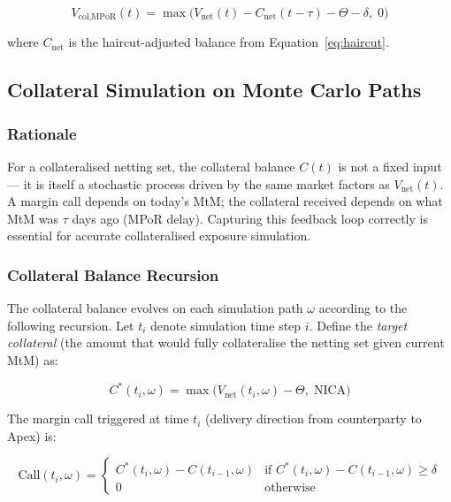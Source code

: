 \documentclass[11pt,a4paper]{article}
\begin{document}
\begin{equation}
  V_{\text{col,MPoR}}(t)
    = \max\!\bigl(V_{\text{net}}(t) - C_{\text{net}}(t-\tau) - \Theta - \delta,\; 0\bigr)
  \label{eq:mpor_exposure}
\end{equation}

where $C_{\text{net}}$ is the haircut-adjusted balance from
Equation~\eqref{eq:haircut}.

\subsection{Collateral Simulation on Monte Carlo Paths}
\label{sec:col_sim}

\subsubsection{Rationale}

For a collateralised netting set, the collateral balance $C(t)$ is not a
fixed input --- it is itself a stochastic process driven by the same market
factors as $V_{\text{net}}(t)$. A margin call depends on today's MtM; the
collateral received depends on what MtM was $\tau$ days ago (MPoR delay).
Capturing this feedback loop correctly is essential for accurate collateralised
exposure simulation.

\subsubsection{Collateral Balance Recursion}

The collateral balance evolves on each simulation path $\omega$ according to
the following recursion. Let $t_i$ denote simulation time step $i$. Define
the \emph{target collateral} (the amount that would fully collateralise the
netting set given current MtM) as:

\begin{equation}
  C^*(t_i, \omega) = \max\!\bigl(V_{\text{net}}(t_i, \omega) - \Theta,\; \text{NICA}\bigr)
  \label{eq:col_target}
\end{equation}

The margin call triggered at time $t_i$ (delivery direction from counterparty
to Apex) is:

\begin{equation}
  \text{Call}(t_i, \omega) =
  \begin{cases}
    C^*(t_i, \omega) - C(t_{i-1}, \omega)
      & \text{if } C^*(t_i, \omega) - C(t_{i-1}, \omega) \geq \delta \\
    0 & \text{otherwise}
  \end{cases}
  \label{eq:margin_call}
\end{equation}
\end{document}
